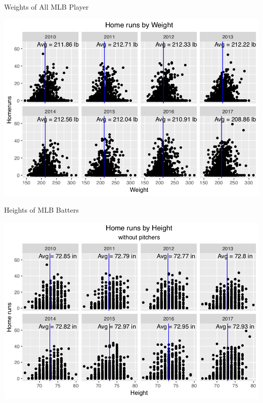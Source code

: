 \documentclass[14pt]{bredelebeamer}
\begin{document}
\begin{frame}{Weights of All MLB Player}
	\begin{center}
    	\includegraphics[scale = 0.6]{Graphs/wh_with_pitchers_1.png}
    \end{center}
\end{frame}

\begin{frame}{Heights of MLB Batters}
	\begin{center}
    	\includegraphics[scale = 0.6]{Graphs/h_wihout_pitchers.png}
    \end{center}
\end{frame}
\end{document}
